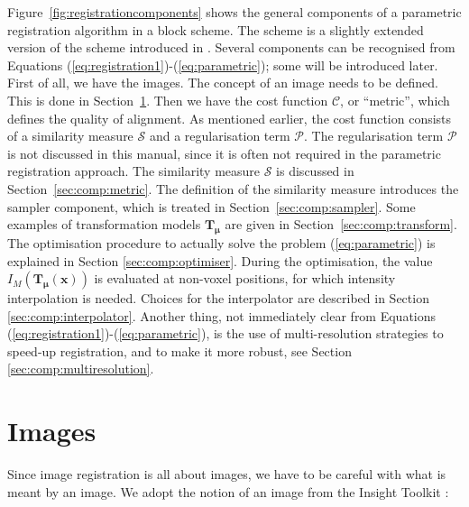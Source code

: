 \documentclass[]{report}
\newcommand{\vx}{\bm{x}}
\newcommand{\vmu}{\bm{\mu}}
\newcommand{\vT}{\bm{T}}
\newcommand{\CC}{\mathcal{C}}
\newcommand{\Sim}{\mathcal{S}}
\newcommand{\Pen}{\mathcal{P}}
\begin{document}
Figure~\ref{fig:registrationcomponents} shows the general
components of a parametric registration algorithm in a block
scheme. The scheme is a slightly extended version of the scheme
introduced in \cite{ITKSoftwareGuideSecondEdition}. Several
components can be recognised from Equations
(\ref{eq:registration1})-(\ref{eq:parametric}); some will be
introduced later. First of all, we have the images. The concept of
an image needs to be defined. This is done in
Section~\ref{sec:comp:image}. Then we have the cost function
$\CC$, or ``metric'', which defines the quality of alignment. As
mentioned earlier, the cost function consists of a similarity
measure $\Sim$ and a regularisation term $\Pen$. The
regularisation term $\Pen$ is not discussed in this manual, since
it is often not required in the parametric registration approach.
The similarity measure $\Sim$ is discussed in
Section~\ref{sec:comp:metric}. The definition of the similarity
measure introduces the sampler component, which is treated in
Section~\ref{sec:comp:sampler}. Some examples of transformation
models $\vT_{\vmu}$ are given in Section~\ref{sec:comp:transform}.
The optimisation procedure to actually solve the problem
(\ref{eq:parametric}) is explained in Section
\ref{sec:comp:optimiser}. During the optimisation, the value
$I_M(\vT_{\vmu}(\vx))$ is evaluated at non-voxel positions, for
which intensity interpolation is needed. Choices for the
interpolator are described in Section \ref{sec:comp:interpolator}.
Another thing, not immediately clear from Equations
(\ref{eq:registration1})-(\ref{eq:parametric}), is the use of
multi-resolution strategies to speed-up registration, and to make
it more robust, see Section \ref{sec:comp:multiresolution}.

\section{Images}\label{sec:comp:image}

Since image registration is all about images, we have to be
careful with what is meant by an image. We adopt the notion of an
image from the Insight Toolkit \citep[p.
40]{ITKSoftwareGuideSecondEdition}:
\end{document}
